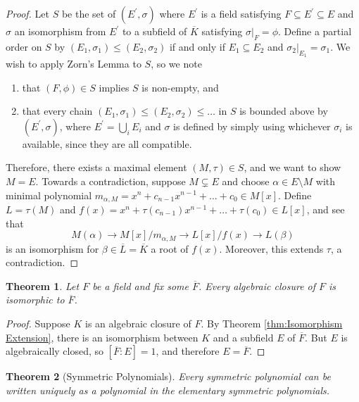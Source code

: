 \documentclass[
    parskip=half,
    toc=flat,
    toc=sectionentrydotfill,
]{scrartcl}  %
\theoremstyle{definition}
\theoremstyle{plain}
\newtheorem{theorem}{Theorem}[section]
\theoremstyle{remark}
\begin{document}
\begin{proof}
    Let $S$ be the set of $(E^\prime,\sigma)$ where $E^\prime$ is a field satisfying $F\subseteq E^\prime\subseteq E$
    and $\sigma$ an isomorphism from $E^\prime$ to a subfield of $\overline{K}$ satisfying $\sigma\vert_F=\phi$.
    Define a partial order on $S$ by $(E_1,\sigma_1)\leq (E_2,\sigma_2)$ if and only if $E_1\subseteq E_2$ and
    $\sigma_2\vert_{E_1}=\sigma_1$.
    We wish to apply Zorn's Lemma to $S$, so we note
    \begin{enumerate}
        \item that $(F,\phi)\in S$ implies $S$ is non-empty, and

        \item
            that every chain $(E_1,\sigma_1)\leq(E_2,\sigma_2)\leq\dots$ in $S$ is bounded above by
            $(E^\prime,\sigma)$, where $E^\prime=\bigcup_iE_i$ and $\sigma$ is defined by simply using whichever
            $\sigma_i$ is available, since they are all compatible.
    \end{enumerate}
    Therefore, there exists a maximal element $(M,\tau)\in S$, and we want to show $M=E$.
    Towards a contradiction, suppose $M\subsetneq E$ and choose $\alpha\in E\setminus M$ with minimal polynomial
    $m_{\alpha,M}=x^n+c_{n-1}x^{n-1}+\dots+c_0\in M[x]$.
    Define $L=\tau(M)$ and $f(x)=x^n+\tau(c_{n-1})x^{n-1}+\dots+\tau(c_0)\in L[x]$, and see that
    \[M(\alpha)\to M[x]/m_{\alpha,M}\to L[x]/f(x)\to L(\beta)\]
    is an isomorphism for $\beta\in\overline{L}=\overline{K}$ a root of $f(x)$.
    Moreover, this extends $\tau$, a contradiction.
\end{proof}

\begin{theorem}
    Let $F$ be a field and fix some $\overline{F}$.
    Every algebraic closure of $F$ is isomorphic to $\overline{F}$.
\end{theorem}

\begin{proof}
    Suppose $K$ is an algebraic closure of $F$.
    By Theorem \ref{thm:Isomorphism Extension}, there is an isomorphism between $K$ and a subfield $E$ of $\overline{F}$.
    But $E$ is algebraically closed, so $[\overline{F}:E]=1$, and therefore $E=\overline{F}$.
\end{proof}

\begin{theorem}[Symmetric Polynomials]
    Every symmetric polynomial can be written uniquely as a polynomial in the elementary symmetric polynomials.
\end{theorem}
\end{document}
